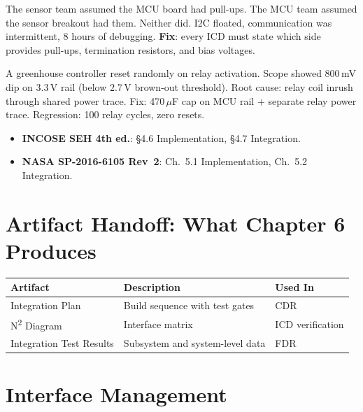 \begin{greenshieldbox}
The sensor team assumed the MCU board had pull-ups. The MCU team assumed the sensor breakout had them. Neither did. I2C floated, communication was intermittent, 8 hours of debugging. \textbf{Fix}: every ICD must state which side provides pull-ups, termination resistors, and bias voltages.
\end{greenshieldbox}

\begin{tipbox}
A greenhouse controller reset randomly on relay activation. Scope showed 800\,mV dip on 3.3\,V rail (below 2.7\,V brown-out threshold). Root cause: relay coil inrush through shared power trace. Fix: 470\,$\mu$F cap on MCU rail + separate relay power trace. Regression: 100 relay cycles, zero resets.
\end{tipbox}

\begin{keyconceptbox}
\begin{itemize}[nosep,leftmargin=1.5em]
\item \textbf{INCOSE SEH 4th ed.}: \S4.6 Implementation, \S4.7 Integration.
\item \textbf{NASA SP-2016-6105 Rev~2}: Ch.~5.1 Implementation, Ch.~5.2 Integration.
\end{itemize}
\end{keyconceptbox}

\section{Artifact Handoff: What Chapter 6 Produces}
\begin{table}[htbp]\centering\small
\begin{tabularx}{\textwidth}{l X l}
\toprule
\textbf{Artifact} & \textbf{Description} & \textbf{Used In} \\
\midrule
Integration Plan & Build sequence with test gates & CDR \\
N\textsuperscript{2} Diagram & Interface matrix & ICD verification \\
Integration Test Results & Subsystem and system-level data & FDR \\
\bottomrule
\end{tabularx}
\end{table}

\section{Interface Management}

